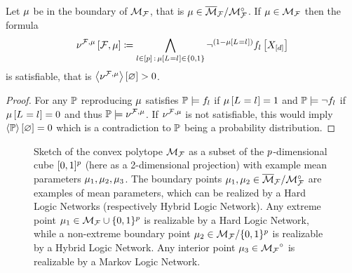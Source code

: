 \begin{lemma}\label{lem:meanHLNrealizabilityCondition}
	Let $\mu$ be in the boundary of $\mathcal{M}_{\mathcal{F}}$, that is $\mu\in\overline{\mathcal{M}}_{\mathcal{F}}/{\mathcal{M}}^{\circ}_{\mathcal{F}}$.
	If $\mu\in\mathcal{M}_{\mathcal{F}}$ then the formula
		\[ \nu^{\mathcal{F},\mu}\left[\mathcal{F},\mu\right] \coloneqq \bigwedge_{l\in[p] \, : \, \mu\left[L_{}=l_{}\right]\in\{0,1\}}
		\lnot^{(1-\mu\left[L_{}=l_{}\right])} f_{l}\left[X_{[d]}\right] \]
	is satisfiable, that is $\left\langle \nu^{\mathcal{F},\mu}\right\rangle \left[ \varnothing \right]>0$. %
\end{lemma}
\begin{proof}
	For any $\mathbb{P}$ reproducing $\mu$ satisfies $\mathbb{P}\models f_{l}$ if $\mu\left[L_{}=l_{}\right]=1$ and $\mathbb{P}\models\lnot f_{l}$ if $\mu\left[L_{}=l_{}\right]=0$ and thus $\mathbb{P}\models\nu^{\mathcal{F},\mu}$.
	If $\nu^{\mathcal{F},\mu}$ is not satisfiable, this would imply $\left\langle \mathbb{P}\right\rangle \left[ \varnothing \right]=0$ which is a contradiction to $\mathbb{P}$ being a probability distribution.
\end{proof}



\begin{figure}[h]\label{fig:meansetSketch}
\begin{center}
	
\end{center}
\caption{Sketch of the convex polytope ${\mathcal{M}_{\mathcal{F}}}$ as a subset of the $p$-dimensional cube $[0,1]^p$ (here as a 2-dimensional projection) with example mean 	parameters $\mu_1,\mu_2,\mu_3$.
	The boundary points $\mu_1,\mu_2\in\overline{\mathcal{M}}_{\mathcal{F}}/{\mathcal{M}}^{\circ}_{\mathcal{F}}$ are examples of mean parameters, which can be realized by a Hard Logic Networks (respectively Hybrid Logic Network). %
	Any extreme point $\mu_1\in\mathcal{M}_{\mathcal{F}}\cup\{0,1\}^{p}$ is realizable by a Hard Logic Network, while a non-extreme boundary point $\mu_2\in\mathcal{M}_{\mathcal{F}}/\{0,1\}^{p}$ is realizable by a Hybrid Logic Network.
	Any interior point $\mu_3\in{\mathcal{M}_{\mathcal{F}}}^{\circ}$ is realizable by a Markov Logic Network.
} 
\end{figure}




